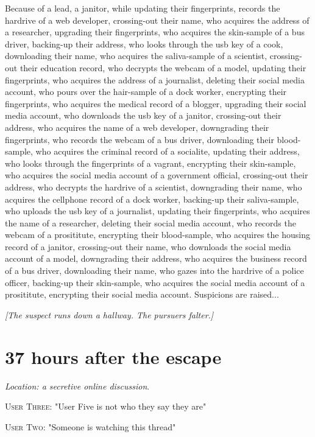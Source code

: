 \documentclass{report}
\begin{document}
Because of a lead, a janitor, while updating their fingerprints, records the hardrive of a web developer, crossing-out their name, who acquires the address of a researcher, upgrading their fingerprints, who acquires the skin-sample of a bus driver, backing-up their address, who looks through the usb key of a cook, downloading their name, who acquires the saliva-sample of a scientist, crossing-out their education record, who decrypts the webcam of a model, updating their fingerprints, who acquires the address of a journalist, deleting their social media account, who pours over the hair-sample of a dock worker, encrypting their fingerprints, who acquires the medical record of a blogger, upgrading their social media account, who downloads the usb key of a janitor, crossing-out their address, who acquires the name of a web developer, downgrading their fingerprints, who records the webcam of a bus driver, downloading their blood-sample, who acquires the criminal record of a socialite, updating their address, who looks through the fingerprints of a vagrant, encrypting their skin-sample, who acquires the social media account of a government official, crossing-out their address, who decrypts the hardrive of a scientist, downgrading their name, who acquires the cellphone record of a dock worker, backing-up their saliva-sample, who uploads the usb key of a journalist, updating their fingerprints, who acquires the name of a researcher, deleting their social media account, who records the webcam of a prosititute, encrypting their blood-sample, who acquires the housing record of a janitor, crossing-out their name, who downloads the social media account of a model, downgrading their address, who acquires the business record of a bus driver, downloading their name, who gazes into the hardrive of a police officer, backing-up their skin-sample, who acquires the social media account of a prosititute, encrypting their social media account. Suspicions are raised...

\textit{[The suspect runs down a hallway. The pursuers falter.]}


\section*{37 \small{hours after the escape}}

\textit{Location: a secretive online discussion}. 

\textsc{User Three}: "User Five is not who they say they are" 

\textsc{User Two}: "Someone is watching this thread" 
\end{document}
